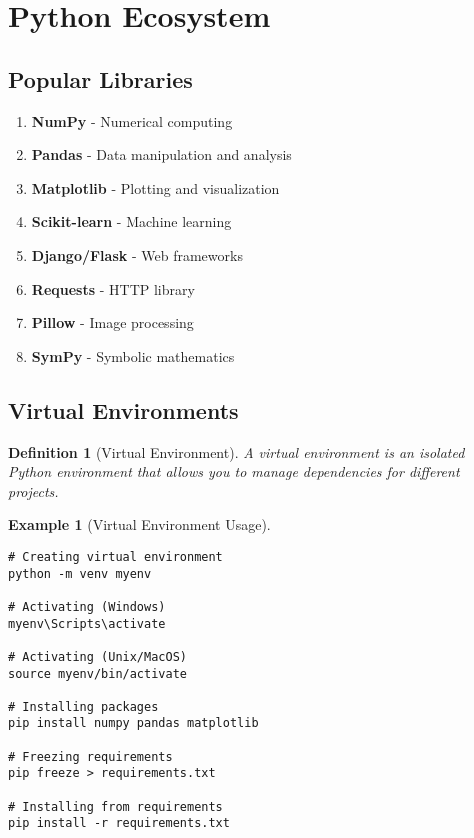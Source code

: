 \documentclass[11pt]{article}
\newtheorem{definition}{Definition}[section]
\newtheorem{example}{Example}[section]
\begin{document}
\section{Python Ecosystem}

\subsection{Popular Libraries}

\begin{enumerate}
    \item \textbf{NumPy} - Numerical computing
    \item \textbf{Pandas} - Data manipulation and analysis
    \item \textbf{Matplotlib} - Plotting and visualization
    \item \textbf{Scikit-learn} - Machine learning
    \item \textbf{Django/Flask} - Web frameworks
    \item \textbf{Requests} - HTTP library
    \item \textbf{Pillow} - Image processing
    \item \textbf{SymPy} - Symbolic mathematics
\end{enumerate}

\subsection{Virtual Environments}

\begin{definition}[Virtual Environment]
A virtual environment is an isolated Python environment that allows you to manage dependencies for different projects.
\end{definition}

\begin{example}[Virtual Environment Usage]
\begin{lstlisting}
# Creating virtual environment
python -m venv myenv

# Activating (Windows)
myenv\Scripts\activate

# Activating (Unix/MacOS)
source myenv/bin/activate

# Installing packages
pip install numpy pandas matplotlib

# Freezing requirements
pip freeze > requirements.txt

# Installing from requirements
pip install -r requirements.txt
\end{lstlisting}
\end{example}
\end{document}
